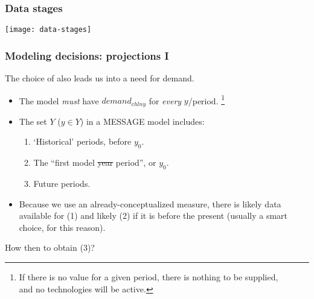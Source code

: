 \documentclass[12pt,aspectratio=169]{beamer}
\begin{document}
\begin{frame}
\frametitle{Data stages}
\texttt{[image: data-stages]}
\end{frame}

\begin{frame}
\frametitle{Modeling decisions: projections I}

The choice of  also leads us into a need for  demand.

\medskip
\begin{itemize}
  \item The model \emph{must} have $demand_{chlny}$ for \emph{every} $y$/period.%
    \footnote{If there is no value for a given period, there is nothing to be supplied,\\\hspace{25mm} and no technologies will be active.}
  \item The set $Y$ ($y \in Y$) in a MESSAGE model includes:
    \begin{enumerate}
      \item ‘Historical’ periods, before $y_0$.
      \item The “first model \sout{year} period”, or $y_0$.
      \item Future periods.
    \end{enumerate}
  \item Because we use an already-conceptualized measure, there is likely data available for (1) and likely (2) if it is before the present (usually a smart choice, for this reason).
\end{itemize}

\medskip
How then to obtain (3)?

\end{frame}
\end{document}
